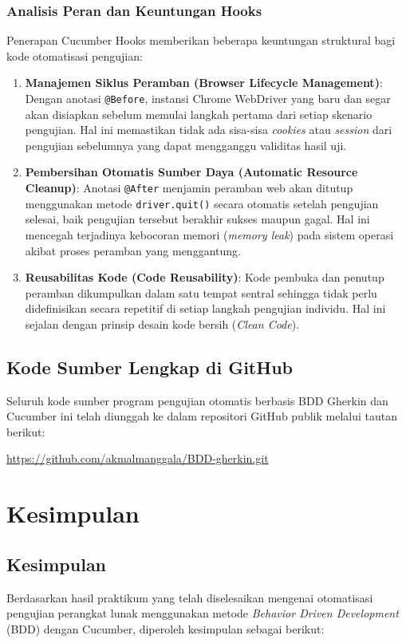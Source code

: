 \documentclass[a4paper,oneside,11pt]{book}
\begin{document}
\subsection{Analisis Peran dan Keuntungan Hooks}
Penerapan Cucumber Hooks memberikan beberapa keuntungan struktural bagi kode otomatisasi pengujian:
\begin{enumerate}
    \item \textbf{Manajemen Siklus Peramban (Browser Lifecycle Management)}: Dengan anotasi \texttt{@Before}, instansi Chrome WebDriver yang baru dan segar akan disiapkan sebelum memulai langkah pertama dari setiap skenario pengujian. Hal ini memastikan tidak ada sisa-sisa \textit{cookies} atau \textit{session} dari pengujian sebelumnya yang dapat mengganggu validitas hasil uji.
    \item \textbf{Pembersihan Otomatis Sumber Daya (Automatic Resource Cleanup)}: Anotasi \texttt{@After} menjamin peramban web akan ditutup menggunakan metode \texttt{driver.quit()} secara otomatis setelah pengujian selesai, baik pengujian tersebut berakhir sukses maupun gagal. Hal ini mencegah terjadinya kebocoran memori (\textit{memory leak}) pada sistem operasi akibat proses peramban yang menggantung.
    \item \textbf{Reusabilitas Kode (Code Reusability)}: Kode pembuka dan penutup peramban dikumpulkan dalam satu tempat sentral sehingga tidak perlu didefinisikan secara repetitif di setiap langkah pengujian individu. Hal ini sejalan dengan prinsip desain kode bersih (\textit{Clean Code}).
\end{enumerate}

\section{Kode Sumber Lengkap di GitHub}
Seluruh kode sumber program pengujian otomatis berbasis BDD Gherkin dan Cucumber ini telah diunggah ke dalam repositori GitHub publik melalui tautan berikut:
\begin{center}
    \url{https://github.com/akmalmanggala/BDD-gherkin.git}
\end{center}


\chapter{Kesimpulan}

\section{Kesimpulan}
Berdasarkan hasil praktikum yang telah diselesaikan mengenai otomatisasi pengujian perangkat lunak menggunakan metode \textit{Behavior Driven Development} (BDD) dengan Cucumber, diperoleh kesimpulan sebagai berikut:
\end{document}
